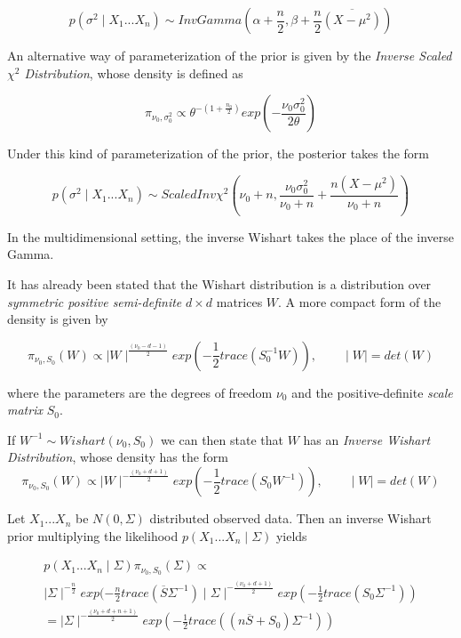 \documentclass[12pt,openright,twoside,a4paper]{book}
\begin{document}
\begin{equation}
p( \sigma^2 \mid X_1...X_n)\sim InvGamma(\alpha + \frac{n}{2}, \beta + \frac{n}{2} \overline{(X-\mu^2)})
\end{equation}

An alternative way of parameterization of the prior is given by the \textit{Inverse Scaled $\chi^2$ Distribution}, whose density is defined as

\begin{equation}
\pi_{\nu_0, \sigma_0^2}\propto \theta^{-(1+ \frac{n_0}{2})}exp(-\frac{\nu_0 \sigma_0^2}{2\theta})
\end{equation}

Under this kind of parameterization of the prior, the posterior takes the form

\begin{equation}
p(\sigma^2 \mid X_1...X_n)\sim ScaledInv\chi^2(\nu_0+n, \frac{\nu_0 \sigma_0^2}{\nu_0 + n} + \frac{n(X-\mu^2)}{\nu_0 + n})
\end{equation}

In the multidimensional setting, the inverse Wishart takes the place of the inverse Gamma.

It has already been stated that the Wishart distribution is a distribution over \textit{symmetric positive semi-definite} $d\times d$ matrices $W$. A more compact form of the density is given by

\begin{equation}
\pi_{\nu_0, S_0}(W)\propto \mid W\mid ^{\frac{(\nu_0-d-1)}{2}}exp(-\frac{1}{2}trace(S_0^{-1}W)), \qquad \mid W\mid=det(W)
\end{equation}

where the parameters are the degrees of freedom $\nu_0$ and the positive-definite \textit{scale matrix}
$S_0$.

If $W^{-1}\sim Wishart(\nu_0, S_0)$ we can then state that $W$ has an \textit{Inverse Wishart Distribution}, whose density has the form
\begin{equation}
\pi_{\nu_0, S_0}(W)\propto \mid W\mid ^{-\frac{(\nu_0+d+1)}{2}}exp(-\frac{1}{2}trace(S_0W^{-1})), \qquad \mid W\mid=det(W)
\end{equation}

Let $X_1...X_n$ be $N(0,\Sigma)$ distributed observed data. Then an inverse Wishart prior multiplying the likelihood $p(X_1...X_n\mid \Sigma)$ yields

\begin{equation}
\begin{aligned}
p(X_1...X_n\mid \Sigma)\pi_{\nu_0, S_0}(\Sigma)\propto \\[10pt]
 \mid\Sigma \mid ^{-\frac{n}{2}}exp(-\frac{n}{2}trace(\overline{S} \Sigma^{-1}) \mid \Sigma\mid ^{-\frac{(\nu_0+d+1)}{2}}exp(-\frac{1}{2}trace(S_0\Sigma^{-1})) \\[10pt]  
=  \mid \Sigma\mid ^{-\frac{(\nu_0+d+n+1)}{2}}exp(-\frac{1}{2}trace((n\overline{S}+S_0)\Sigma^{-1}))
\end{aligned}
\end{equation}
\end{document}
